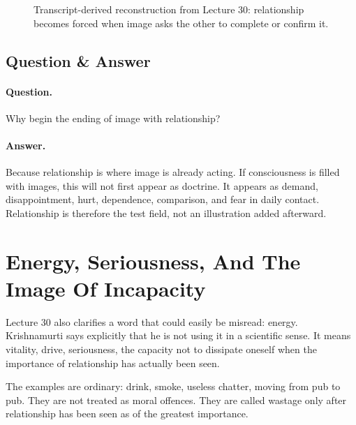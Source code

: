 \documentclass[11pt,oneside]{book}
\begin{document}
\begin{figure}
\centering
{}
\caption{Transcript-derived reconstruction from Lecture 30: relationship becomes forced when image asks the other to complete or confirm it.}
\end{figure}

\subsection{Question \& Answer}

\paragraph{Question.}
Why begin the ending of image with relationship?

\paragraph{Answer.}
Because relationship is where image is already acting. If consciousness is filled with images, this will not first appear as doctrine. It appears as demand, disappointment, hurt, dependence, comparison, and fear in daily contact. Relationship is therefore the test field, not an illustration added afterward.

\section{Energy, Seriousness, And The Image Of Incapacity}

Lecture 30 also clarifies a word that could easily be misread: energy. Krishnamurti says explicitly that he is not using it in a scientific sense. It means vitality, drive, seriousness, the capacity not to dissipate oneself when the importance of relationship has actually been seen.

The examples are ordinary: drink, smoke, useless chatter, moving from pub to pub. They are not treated as moral offences. They are called wastage only after relationship has been seen as of the greatest importance.
\end{document}
